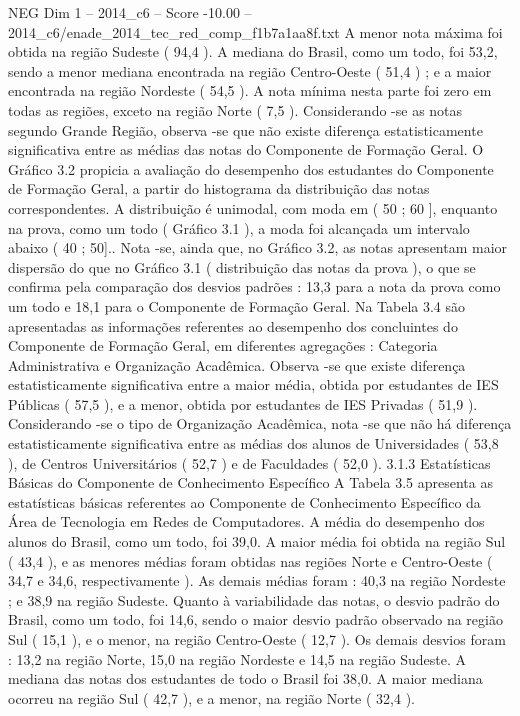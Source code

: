 \begin{textsample}{NEG Dim 1 – 2014\_c6 – Score -10.00 – 2014\_c6/enade\_2014\_tec\_red\_comp\_f1b7a1aa8f.txt}
A menor nota máxima foi obtida na região Sudeste ( 94,4 ).
A mediana do Brasil, como um todo, foi 53,2, sendo a menor mediana encontrada na região Centro-Oeste ( 51,4 ) ; e a maior encontrada na região Nordeste ( 54,5 ).
A nota mínima nesta parte foi zero em todas as regiões, exceto na região Norte ( 7,5 ).
Considerando -se as notas segundo Grande Região, observa -se que não existe diferença estatisticamente significativa entre as médias das notas do Componente de Formação Geral.
O Gráfico 3.2 propicia a avaliação do desempenho dos estudantes do Componente de Formação Geral, a partir do histograma da distribuição das notas correspondentes.
A distribuição é unimodal, com moda em ( 50 ; 60 ], enquanto na prova, como um todo ( Gráfico 3.1 ), a moda foi alcançada um intervalo abaixo ( 40 ; 50]..
Nota -se, ainda que, no Gráfico 3.2, as notas apresentam maior dispersão do que no Gráfico 3.1 ( distribuição das notas da prova ), o que se confirma pela comparação dos desvios padrões : 13,3 para a nota da prova como um todo e 18,1 para o Componente de Formação Geral.
Na Tabela 3.4 são apresentadas as informações referentes ao desempenho dos concluintes do Componente de Formação Geral, em diferentes agregações : Categoria Administrativa e Organização Acadêmica.
Observa -se que existe diferença estatisticamente significativa entre a maior média, obtida por estudantes de IES Públicas ( 57,5 ), e a menor, obtida por estudantes de IES Privadas ( 51,9 ).
Considerando -se o tipo de Organização Acadêmica, nota -se que não há diferença estatisticamente significativa entre as médias dos alunos de Universidades ( 53,8 ), de Centros Universitários ( 52,7 ) e de Faculdades ( 52,0 ). 3.1.3 Estatísticas Básicas do Componente de Conhecimento Específico A Tabela 3.5 apresenta as estatísticas básicas referentes ao Componente de Conhecimento Específico da Área de Tecnologia em Redes de Computadores.
A média do desempenho dos alunos do Brasil, como um todo, foi 39,0.
A maior média foi obtida na região Sul ( 43,4 ), e as menores médias foram obtidas nas regiões Norte e Centro-Oeste ( 34,7 e 34,6, respectivamente ).
As demais médias foram : 40,3 na região Nordeste ; e 38,9 na região Sudeste.
Quanto à variabilidade das notas, o desvio padrão do Brasil, como um todo, foi 14,6, sendo o maior desvio padrão observado na região Sul ( 15,1 ), e o menor, na região Centro-Oeste ( 12,7 ).
Os demais desvios foram : 13,2 na região Norte, 15,0 na região Nordeste e 14,5 na região Sudeste.
A mediana das notas dos estudantes de todo o Brasil foi 38,0.
A maior mediana ocorreu na região Sul ( 42,7 ), e a menor, na região Norte ( 32,4 ).

\end{textsample}
